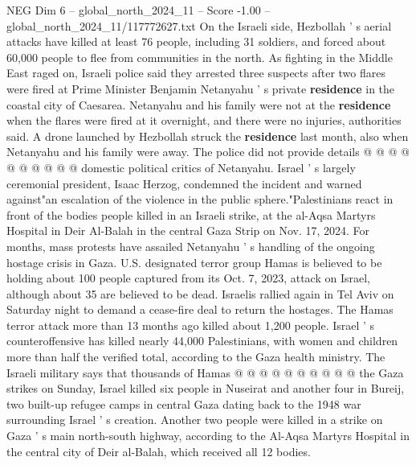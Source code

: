 \begin{textsample}{NEG Dim 6 – global\_north\_2024\_11 – Score -1.00 – global\_north\_2024\_11/117772627.txt}
On the Israeli side, Hezbollah ' s aerial attacks have killed at least 76 people, including 31 soldiers, and forced about 60,000 people to flee from communities in the north.
As fighting in the Middle East raged on, Israeli police said they arrested three suspects after two flares were fired at Prime Minister Benjamin Netanyahu ' s private \textbf{residence} in the coastal city of Caesarea.
Netanyahu and his family were not at the \textbf{residence} when the flares were fired at it overnight, and there were no injuries, authorities said.
A drone launched by Hezbollah struck the \textbf{residence} last month, also when Netanyahu and his family were away.
The police did not provide details @ @ @ @ @ @ @ @ @ @ domestic political critics of Netanyahu.
Israel ' s largely ceremonial president, Isaac Herzog, condemned the incident and warned against"an escalation of the violence in the public sphere."Palestinians react in front of the bodies people killed in an Israeli strike, at the al-Aqsa Martyrs Hospital in Deir Al-Balah in the central Gaza Strip on Nov. 17, 2024.
For months, mass protests have assailed Netanyahu ' s handling of the ongoing hostage crisis in Gaza.
U.S. designated terror group Hamas is believed to be holding about 100 people captured from its Oct. 7, 2023, attack on Israel, although about 35 are believed to be dead.
Israelis rallied again in Tel Aviv on Saturday night to demand a cease-fire deal to return the hostages.
The Hamas terror attack more than 13 months ago killed about 1,200 people.
Israel ' s counteroffensive has killed nearly 44,000 Palestinians, with women and children more than half the verified total, according to the Gaza health ministry.
The Israeli military says that thousands of Hamas @ @ @ @ @ @ @ @ @ @ the Gaza strikes on Sunday, Israel killed six people in Nuseirat and another four in Bureij, two built-up refugee camps in central Gaza dating back to the 1948 war surrounding Israel ' s creation.
Another two people were killed in a strike on Gaza ' s main north-south highway, according to the Al-Aqsa Martyrs Hospital in the central city of Deir al-Balah, which received all 12 bodies.

\end{textsample}
